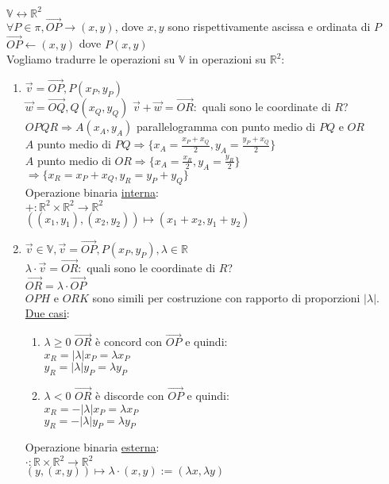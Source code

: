 \documentclass{article}
\newcommand{\ul}[1]{\underline{#1}}
\newcommand{\R}{\mathbb{R}}
\newcommand{\V}{\mathbb{V}}
\begin{document}
$\V\leftrightarrow\R^2$\\
$\forall P\in\pi,\overrightarrow{OP}\rightarrow(x,y)$, dove $x,y$ sono rispettivamente ascissa e ordinata di $P$\\
$\overrightarrow{OP}\leftarrow(x,y)$ dove $P(x,y)$\\
	Vogliamo tradurre le operazioni su $\V$ in operazioni su $\R^2$:
	\begin{enumerate}
		\item $\overrightarrow{v}=\overrightarrow{OP},P(x_P,y_P)$\\
		      $\overrightarrow{w}=\overrightarrow{OQ},Q(x_Q,y_Q)$
		      $\overrightarrow{v}+\overrightarrow{w}=\overrightarrow{OR}:$ quali sono le coordinate di $R$?\\
		      $OPQR\Rightarrow A(x_A,y_A)$ parallelogramma con punto medio di $PQ$ e $OR$\\
		      $A$ punto medio di $PQ\Rightarrow\{x_A=\frac{x_P+x_Q}{2},y_A=\frac{y_P+x_Q}{2}\}$\\
		      $A$ punto medio di $OR\Rightarrow\{x_A=\frac{x_R}{2},y_A=\frac{y_R}{2}\}$\\
		      $\Rightarrow\{x_R=x_P+x_Q,y_R=y_P+y_Q\}$\\
		      Operazione binaria \ul{interna}:\\
		      $+:\R^2\times\R^2\rightarrow\R^2$\\
		      $((x_1,y_1),(x_2,y_2))\mapsto(x_1+x_2,y_1+y_2)$
		\item $\overrightarrow{v}\in\V,\overrightarrow{v}=\overrightarrow{OP},P(x_P,y_P),\lambda\in\R$\\
		      $\lambda\cdot\overrightarrow{v}=\overrightarrow{OR}:$ quali sono le coordinate di $R$?\\
		      $\overrightarrow{OR}=\lambda\cdot\overrightarrow{OP}$\\
		      $OPH$ e $ORK$ sono simili per costruzione con rapporto di proporzioni $|\lambda|$.\\
		      \ul{Due casi}:
		      \begin{enumerate}
			      \item $\lambda\ge0$ $\overrightarrow{OR}$ è concord con $\overrightarrow{OP}$ e quindi:\\
			            $x_R=|\lambda|x_P=\lambda x_P$\\
			            $y_R=|\lambda|y_P=\lambda y_P$
			      \item $\lambda<0$ $\overrightarrow{OR}$ è discorde con $\overrightarrow{OP}$ e quindi:\\
			            $x_R=-|\lambda|x_P=\lambda x_P$\\
			            $y_R=-|\lambda|y_P=\lambda y_P$
		      \end{enumerate}
		      Operazione binaria \ul{esterna}:\\
		      $\cdot:\R\times\R^2\rightarrow\R^2$\\
		      \hspace*{0.1em}$(y,(x,y))\mapsto\lambda\cdot(x,y):=(\lambda x,\lambda y)$
	\end{enumerate}
\end{document}
